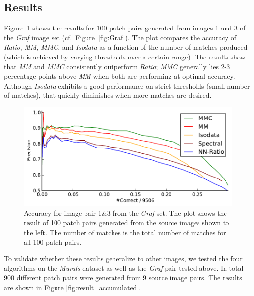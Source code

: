 \documentclass{article}
\begin{document}
\subsection{Results}
\label{S:Results}

Figure~\ref{fig:result_graf} shows the results for 100 patch pairs 
generated from images 1 and 3 of the \emph{Graf} image set 
(cf.~Figure~\ref{fig:Graf}). The plot compares the accuracy of 
\emph{Ratio}, \emph{MM}, \emph{MMC}, and \emph{Isodata} as a function of 
the number of matches produced (which is achieved by varying thresholds 
over a certain range). The results show that \emph{MM} and \emph{MMC} 
consistently outperform \emph{Ratio}; \emph{MMC} generally lies 2-3 
percentage points above \emph{MM} when both are performing at optimal 
accuracy.  Although \emph{Isodata} exhibits a good performance on strict 
thresholds (small number of matches), that quickly diminishes when more 
matches are desired.


\begin{figure}[htb]
			\centering
			\includegraphics[width=0.6\columnwidth]{images/result_graf}
	\caption{Accuracy for image pair 1\&3 from the \emph{Graf} set. The plot 
		shows the result of 100 patch pairs generated from the source 
		images shown to the left. The number of matches is the total 
		number of matches for all 100 patch pairs.}
	\label{fig:result_graf}
\end{figure}

To validate whether these results 
generalize to other images, we tested the four algorithms on the 
\emph{Murals} dataset as well as the \emph{Graf} pair tested above.  
In total 900 different patch pairs were generated from 9 
source image pairs.  The results are shown in Figure 
\ref{fig:result_accumulated}. 
\end{document}
